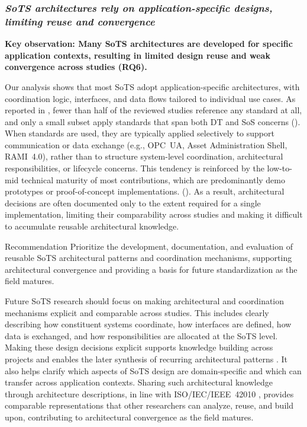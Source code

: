 
\subsubsection{\textit{SoTS architectures rely on application-specific designs, limiting reuse and convergence}}
\textbf{Key observation: Many SoTS architectures are developed for specific application contexts, resulting in limited design reuse and weak convergence across studies (RQ6).}


Our analysis shows that most SoTS adopt application-specific architectures, with coordination logic, interfaces, and data flows tailored to individual use cases. As reported in , fewer than half of the reviewed studies reference any standard at all, and only a small subset apply standards that span both DT and SoS concerns (). When standards are used, they are typically applied selectively to support communication or data exchange (e.g., OPC~UA, Asset Administration Shell, RAMI~4.0), rather than to structure system-level coordination, architectural responsibilities, or lifecycle concerns. This tendency is reinforced by the low-to-mid technical maturity of most contributions, which are predominantly demo prototypes or proof-of-concept implementations. (). As a result, architectural decisions are often documented only to the extent required for a single implementation, limiting their comparability across studies and making it difficult to accumulate reusable architectural knowledge.


\begin{recoframe}{Recommendation}
Prioritize the development, documentation, and evaluation of reusable SoTS architectural patterns and coordination mechanisms, supporting architectural convergence and providing a basis for future standardization as the field matures.
\end{recoframe}

Future SoTS research should focus on making architectural and coordination mechanisms explicit and comparable across studies. This includes clearly describing how constituent systems coordinate, how interfaces are defined, how data is exchanged, and how responsibilities are allocated at the SoTS level. Making these design decisions explicit supports knowledge building across projects and enables the later synthesis of recurring architectural patterns \cite{cloutier2007patterns}. It also helps clarify which aspects of SoTS design are domain-specific and which can transfer across application contexts. Sharing such architectural knowledge through architecture descriptions, in line with ISO/IEC/IEEE~42010 \cite{iso42010}, provides comparable representations that other researchers can analyze, reuse, and build upon, contributing to architectural convergence as the field matures.



